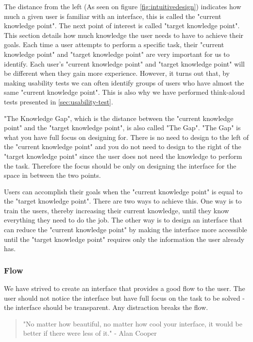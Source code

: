 The distance from the left (As seen on figure \ref{fig:intuitivedesign}) indicates how much a given user is familiar with an interface, this is called the "current knowledge point". The next point of interest is called "target knowledge point". This section details how much knowledge the user needs to have to achieve their goals.
Each time a user attempts to perform a specific task, their "current knowledge point" and "target knowledge point" are very important for us to identify.
Each user's "current knowledge point" and "target knowledge point" will be different when they gain more experience. However, it turns out that, by making usability tests we can often identify groups of users who have almost the same "current knowledge point". This is also why we have performed think-aloud tests presented in \ref{sec:usability-test}.

"The Knowledge Gap", which is the distance between the "current knowledge point" and the "target knowledge point", is also called "The Gap".
"The Gap" is what you have full focus on designing for. There is no need to design to the left of the "current knowledge point" and you do not need to design to the right of the "target knowledge point" since the user does not need the knowledge to perform the task. Therefore the focus should be only on designing the interface for the space in between the two points.

Users can accomplish their goals when the "current knowledge point" is equal to the "target knowledge point". There are two ways to achieve this. One way is to train the users, thereby increasing their current knowledge, until they know everything they need to do the job. The other way is to design an interface that can reduce the "current knowledge point" by making the interface more accessible until the "target knowledge point" requires only the information the user already has.

\subsubsection{Flow}
We have strived to create an interface that provides a good flow to the user. The user should not notice the interface but have full focus on the task to be solved - the interface should be transparent. Any distraction breaks the flow. \cite{alancooper}

\begin{quotation}
"No matter how beautiful, no matter how cool your interface, it would be better if there were less of it."
- Alan Cooper
\end{quotation}

